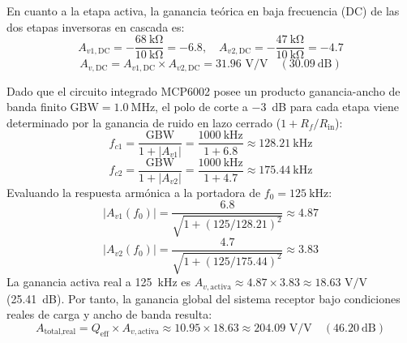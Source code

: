 En cuanto a la etapa activa, la ganancia teórica en baja frecuencia (DC) de las dos etapas inversoras en cascada es:
\begin{equation}
    A_{v1,\text{DC}} = -\frac{\SI{68}{\kilo\ohm}}{\SI{10}{\kilo\ohm}} = -6.8, \quad A_{v2,\text{DC}} = -\frac{\SI{47}{\kilo\ohm}}{\SI{10}{\kilo\ohm}} = -4.7
\end{equation}
\begin{equation}
    A_{v,\text{DC}} = A_{v1,\text{DC}} \times A_{v2,\text{DC}} = 31.96\text{ V/V} \quad (\SI{30.09}{\deci\bel})
\end{equation}

Dado que el circuito integrado MCP6002 posee un producto ganancia-ancho de banda finito $\text{GBW} = \SI{1.0}{\mega\hertz}$, el polo de corte a \SI{-3}{\deci\bel} para cada etapa viene determinado por la ganancia de ruido en lazo cerrado ($1 + R_f / R_{\text{in}}$):
\begin{equation}
    f_{c1} = \frac{\text{GBW}}{1 + |A_{v1}|} = \frac{\SI{1000}{\kilo\hertz}}{1 + 6.8} \approx \SI{128.21}{\kilo\hertz}
\end{equation}
\begin{equation}
    f_{c2} = \frac{\text{GBW}}{1 + |A_{v2}|} = \frac{\SI{1000}{\kilo\hertz}}{1 + 4.7} \approx \SI{175.44}{\kilo\hertz}
\end{equation}
Evaluando la respuesta armónica a la portadora de $f_0 = \SI{125}{\kilo\hertz}$:
\begin{equation}
    |A_{v1}(f_0)| = \frac{6.8}{\sqrt{1 + (125 / 128.21)^2}} \approx 4.87
\end{equation}
\begin{equation}
    |A_{v2}(f_0)| = \frac{4.7}{\sqrt{1 + (125 / 175.44)^2}} \approx 3.83
\end{equation}
La ganancia activa real a \SI{125}{\kilo\hertz} es $A_{v,\text{activa}} \approx 4.87 \times 3.83 \approx 18.63\text{ V/V}$ (\SI{25.41}{\deci\bel}). Por tanto, la ganancia global del sistema receptor bajo condiciones reales de carga y ancho de banda resulta:
\begin{equation}
    A_{\text{total,real}} = Q_{\text{eff}} \times A_{v,\text{activa}} \approx 10.95 \times 18.63 \approx 204.09\text{ V/V} \quad (\SI{46.20}{\deci\bel})
\end{equation}

